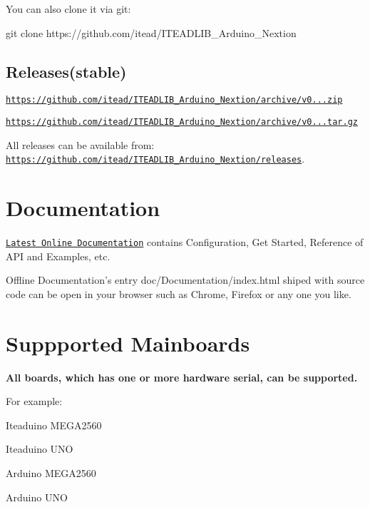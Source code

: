 You can also clone it via git\+: \begin{DoxyVerb}git clone https://github.com/itead/ITEADLIB_Arduino_Nextion
\end{DoxyVerb}


\subsection*{Releases(stable)}


\begin{DoxyItemize}
\item \href{https://github.com/itead/ITEADLIB_Arduino_Nextion/archive/v0.7.0.zip}{\tt https\+://github.\+com/itead/\+I\+T\+E\+A\+D\+L\+I\+B\+\_\+\+Arduino\+\_\+\+Nextion/archive/v0...\+zip}
\item \href{https://github.com/itead/ITEADLIB_Arduino_Nextion/archive/v0.7.0.tar.gz}{\tt https\+://github.\+com/itead/\+I\+T\+E\+A\+D\+L\+I\+B\+\_\+\+Arduino\+\_\+\+Nextion/archive/v0...\+tar.\+gz}
\end{DoxyItemize}

All releases can be available from\+: \href{https://github.com/itead/ITEADLIB_Arduino_Nextion/releases}{\tt https\+://github.\+com/itead/\+I\+T\+E\+A\+D\+L\+I\+B\+\_\+\+Arduino\+\_\+\+Nextion/releases}.

\section*{Documentation}

\href{http://docs.iteadstudio.com/ITEADLIB_Arduino_Nextion/index.html}{\tt Latest Online Documentation} contains Configuration, Get Started, Reference of A\+P\+I and Examples, etc.

Offline Documentation's entry {\ttfamily doc/\+Documentation/index.\+html} shiped with source code can be open in your browser such as Chrome, Firefox or any one you like.

\section*{Suppported Mainboards}

{\bfseries All boards, which has one or more hardware serial, can be supported.}

For example\+:


\begin{DoxyItemize}
\item Iteaduino M\+E\+G\+A2560
\item Iteaduino U\+N\+O
\item Arduino M\+E\+G\+A2560
\item Arduino U\+N\+O
\end{DoxyItemize}

